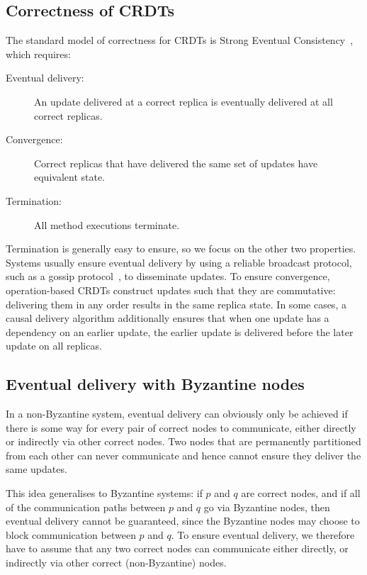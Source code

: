 \documentclass[sigplan,review]{acmart}
\begin{document}
\subsection{Correctness of CRDTs}\label{sec:sec}

The standard model of correctness for CRDTs is Strong Eventual Consistency~\cite{Shapiro:2011,Gomes:2017gy}, which requires:
\begin{description}
\item[Eventual delivery:] An update delivered at a correct replica is eventually delivered at all correct replicas.
\item[Convergence:] Correct replicas that have delivered the same set of updates have equivalent state.
\item[Termination:] All method executions terminate.
\end{description}

Termination is generally easy to ensure, so we focus on the other two properties.
Systems usually ensure eventual delivery by using a reliable broadcast protocol, such as a gossip protocol~\cite{Leitao:2009fi}, to disseminate updates.
To ensure convergence, operation-based CRDTs construct updates such that they are commutative: delivering them in any order results in the same replica state.
In some cases, a causal delivery algorithm additionally ensures that when one update has a dependency on an earlier update, the earlier update is delivered before the later update on all replicas.

\subsection{Eventual delivery with Byzantine nodes}\label{sec:delivery}

In a non-Byzantine system, eventual delivery can obviously only be achieved if there is some way for every pair of correct nodes to communicate, either directly or indirectly via other correct nodes.
Two nodes that are permanently partitioned from each other can never communicate and hence cannot ensure they deliver the same updates.

This idea generalises to Byzantine systems: if $p$ and $q$ are correct nodes, and if all of the communication paths between $p$ and $q$ go via Byzantine nodes, then eventual delivery cannot be guaranteed, since the Byzantine nodes may choose to block communication between $p$ and $q$.
To ensure eventual delivery, we therefore have to assume that any two correct nodes can communicate either directly, or indirectly via other correct (non-Byzantine) nodes.
\end{document}
